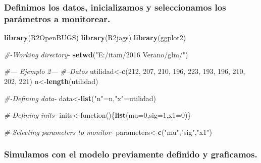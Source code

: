 \documentclass[]{article}
\newenvironment{Shaded}{\begin{snugshade}}{\end{snugshade}}
\newcommand{\KeywordTok}[1]{\textcolor[rgb]{0.13,0.29,0.53}{\textbf{{#1}}}}
\newcommand{\DataTypeTok}[1]{\textcolor[rgb]{0.13,0.29,0.53}{{#1}}}
\newcommand{\DecValTok}[1]{\textcolor[rgb]{0.00,0.00,0.81}{{#1}}}
\newcommand{\StringTok}[1]{\textcolor[rgb]{0.31,0.60,0.02}{{#1}}}
\newcommand{\CommentTok}[1]{\textcolor[rgb]{0.56,0.35,0.01}{\textit{{#1}}}}
\newcommand{\NormalTok}[1]{{#1}}
\begin{document}
\subsubsection{Definimos los datos, inicializamos y seleccionamos los
parámetros a
monitorear.}\label{definimos-los-datos-inicializamos-y-seleccionamos-los-parametros-a-monitorear.}

\begin{Shaded}
\begin{Highlighting}[]
\KeywordTok{library}\NormalTok{(R2OpenBUGS)}
\KeywordTok{library}\NormalTok{(R2jags)}
\KeywordTok{library}\NormalTok{(ggplot2)}
\end{Highlighting}
\end{Shaded}

\begin{Shaded}
\begin{Highlighting}[]
\CommentTok{#-Working directory-}
\KeywordTok{setwd}\NormalTok{(}\StringTok{"E:/itam/2016 Verano/glm/"}\NormalTok{)}

\CommentTok{#--- Ejemplo 2---}
\CommentTok{#--Datos}
\NormalTok{utilidad<-}\KeywordTok{c}\NormalTok{(}\DecValTok{212}\NormalTok{, }\DecValTok{207}\NormalTok{, }\DecValTok{210}\NormalTok{, }\DecValTok{196}\NormalTok{, }\DecValTok{223}\NormalTok{, }\DecValTok{193}\NormalTok{, }\DecValTok{196}\NormalTok{, }\DecValTok{210}\NormalTok{, }\DecValTok{202}\NormalTok{, }\DecValTok{221}\NormalTok{)}
\NormalTok{n<-}\KeywordTok{length}\NormalTok{(utilidad)}

\CommentTok{#-Defining data-}
\NormalTok{data<-}\KeywordTok{list}\NormalTok{(}\StringTok{"n"}\NormalTok{=n,}\StringTok{"x"}\NormalTok{=utilidad)}

\CommentTok{#-Defining inits-}
\NormalTok{inits<-function()\{}\KeywordTok{list}\NormalTok{(}\DataTypeTok{mu=}\DecValTok{0}\NormalTok{,}\DataTypeTok{sig=}\DecValTok{1}\NormalTok{,}\DataTypeTok{x1=}\DecValTok{0}\NormalTok{)\}}

\CommentTok{#-Selecting parameters to monitor-}
\NormalTok{parameters<-}\KeywordTok{c}\NormalTok{(}\StringTok{"mu"}\NormalTok{,}\StringTok{"sig"}\NormalTok{,}\StringTok{"x1"}\NormalTok{)}
\end{Highlighting}
\end{Shaded}

\subsubsection{Simulamos con el modelo previamente definido y
graficamos.}\label{simulamos-con-el-modelo-previamente-definido-y-graficamos.}
\end{document}
